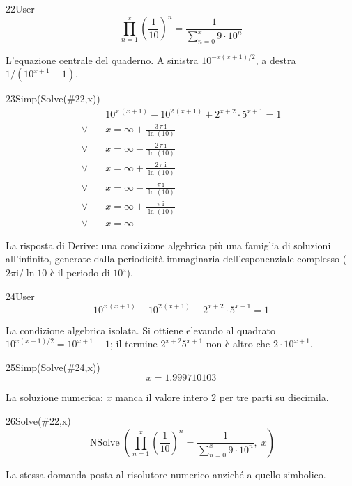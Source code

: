 \begin{espr}{22}{User}{}
\[
\prod_{n=1}^{x} \left(\frac{1}{10}\right)^{n} = \frac{1}{\sum_{n=0}^{x} 9 \cdot 10^{n}}
\]
\end{espr}
L'equazione centrale del quaderno. A sinistra $10^{-x(x+1)/2}$, a destra $1/(10^{x+1}-1)$.

\begin{espr}{23}{Simp(Solve(\#22,x))}{}
\begin{align*}
& 10^{x\, \left(x + 1\right)} - 10^{2\, \left(x + 1\right)} + 2^{x + 2} \cdot 5^{x + 1} = 1 \\[3pt]
\lor\quad & x = \infty + \frac{3\, \pi\, \mathrm{i}}{\ln\!\left(10\right)} \\[3pt]
\lor\quad & x = \infty - \frac{2\, \pi\, \mathrm{i}}{\ln\!\left(10\right)} \\[3pt]
\lor\quad & x = \infty + \frac{2\, \pi\, \mathrm{i}}{\ln\!\left(10\right)} \\[3pt]
\lor\quad & x = \infty - \frac{\pi\, \mathrm{i}}{\ln\!\left(10\right)} \\[3pt]
\lor\quad & x = \infty + \frac{\pi\, \mathrm{i}}{\ln\!\left(10\right)} \\[3pt]
\lor\quad & x = \infty
\end{align*}
\end{espr}
La risposta di Derive: una condizione algebrica più una famiglia di soluzioni all'infinito, generate dalla periodicità immaginaria dell'esponenziale complesso ($2\pi\mathrm{i}/\ln 10$ è il periodo di $10^{z}$).

\begin{espr}{24}{User}{}
\[
10^{x\, \left(x + 1\right)} - 10^{2\, \left(x + 1\right)} + 2^{x + 2} \cdot 5^{x + 1} = 1
\]
\end{espr}
La condizione algebrica isolata. Si ottiene elevando al quadrato $10^{x(x+1)/2}=10^{x+1}-1$; il termine $2^{x+2}5^{x+1}$ non è altro che $2\cdot 10^{x+1}$.

\begin{espr}{25}{Simp(Solve(\#24,x))}{}
\[
x = 1.999710103
\]
\end{espr}
La soluzione numerica: $x$ manca il valore intero $2$ per tre parti su diecimila.

\begin{espr}{26}{Solve(\#22,x)}{}
\[
\operatorname{NSolve}\!\left(\prod_{n=1}^{x} \left(\frac{1}{10}\right)^{n} = \frac{1}{\sum_{n=0}^{x} 9 \cdot 10^{n}},\; x\right)
\]
\end{espr}
La stessa domanda posta al risolutore numerico anziché a quello simbolico.

